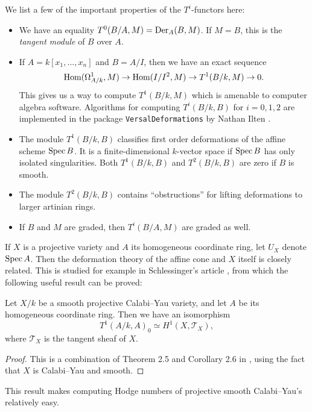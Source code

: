 We list a few of the important properties of the $T^i$-functors here:

\begin{itemize}
	\item We have an equality $T^0(B/A,M) = \operatorname{Der}_A(B,M)$. If $M=B$, this is the \emph{tangent module} of $B$ over $A$.
	\item If $A=k[x_1,\ldots,x_n]$ and $B=A/I$, then we have an exact sequence
	\begin{equation}
	\label{eq:t1seq}
	\operatorname{Hom}(\Omega_{A/k}^1,M) \to \operatorname{Hom}(I/I^2,M) \to T^1(B/k,M) \to 0.
	\end{equation}
	This gives us a way to compute $T^1(B/k,M)$ which is amenable to computer algebra software. Algorithms for computing $T^i(B/k,B)$ for $i=0,1,2$ are implemented in the \MM package \texttt{VersalDeformations} by Nathan Ilten \cite{ilten_versaldeformations}.
	\item The module $T^1(B/k,B)$ classifies first order deformations of the affine scheme $\operatorname{Spec} B$. It is a finite-dimensional $k$-vector space if $\operatorname{Spec} B$ has only isolated singularities. Both $T^1(B/k,B)$ and $T^2(B/k,B)$ are zero if $B$ is smooth.
	\item The module $T^2(B/k,B)$ contains ``obstructions'' for lifting deformations to larger artinian rings.
	\item If $B$ and $M$ are graded, then $T^i(B/A,M)$ are graded as well. 
\end{itemize}

If $X$ is a projective variety and $A$ its homogeneous coordinate ring, let $U_X$ denote $\operatorname{Spec} A$. Then the deformation theory of the affine cone and $X$ itself is closely related. This is studied for example in Schlessinger's article \cite{schlessinger_rigid}, from which the following useful result can be proved:

\begin{proposition}
\label{prop:t1h1}
Let $X/k$ be a smooth projective Calabi--Yau variety, and let $A$ be its homogeneous coordinate ring. Then we have an isomorphism
$$
T^1(A/k,A)_0  \simeq H^1(X, \mathcal T_X),
$$
where $\mathcal T_X$ is the tangent sheaf of $X$.
\end{proposition}
\begin{proof}
This is a combination of Theorem 2.5 and Corollary 2.6 in \cite{t1_ref}, using the fact that $X$ is Calabi--Yau and smooth.
\end{proof}

This result makes computing Hodge numbers of projective smooth Calabi--Yau's relatively easy.

